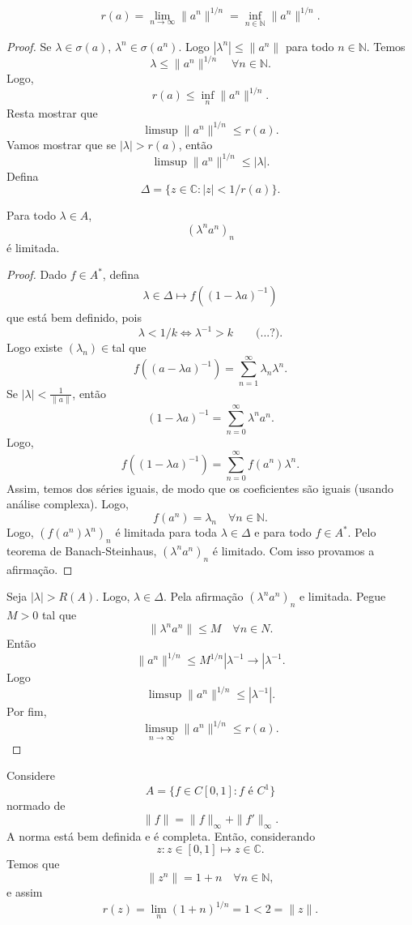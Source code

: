 \documentclass[portuguese]{article}
\theoremstyle{definition}
\newcommand{\N}{\mathbb{N}}
\newcommand{\C}{\mathbb{C}}
\begin{document}
\begin{teo}
	\[r(a)=\lim_{n\to\infty}\|a^n\|^{1/n}=\inf_{n\in\N}\|a^n\|^{1/n}.\]
\end{teo}
\begin{proof}
	Se $\lambda\in\sigma(a)$, $\lambda^n\in\sigma(a^n)$. Logo $|\lambda^n|\leq\|a^n\|$ para todo $n\in\N$. Temos
	\[\lambda\leq\|a^n\|^{1/n}\quad\forall n\in\N.\]
	Logo,
	\[r(a)\leq\inf_n\|a^n\|^{1/n}.\]
	Resta mostrar que
	\[\limsup\|a^n\|^{1/n}\leq r(a).\]
	Vamos mostrar que se $|\lambda|>r(a)$, então
	\[\limsup\|a^n\|^{1/n}\leq|\lambda|.\]
	Defina
	\[\Delta=\{z\in\C:|z|<1/r(a)\}.\]
	\begin{af*}
		Para todo $\lambda\in A$,
		\[(\lambda^na^n)_n\]
		é limitada.
	\end{af*}
\begin{proof}
		Dado $f\in A^*$, defina
	\begin{align*}
		\lambda\in\Delta\mapsto f((1-\lambda a)^{-1})
	\end{align*}
	{\color{orange} que está bem definido, pois
		\[\lambda<1/k\iff\lambda^{-1}>k \qquad\text{(...?)}.\]
}
	Logo existe $(\lambda_n)\in $tal que
	\[f((a-\lambda a)^{-1})=\sum_{n=1}^\infty \lambda_n\lambda^n.\]
	Se $|\lambda|<\frac{1}{\|a\|}$, então
	\[(1-\lambda a)^{-1}=\sum_{n=0}^\infty\lambda^na^n.\]
	Logo,
	\[f((1-\lambda a)^{-1})=\sum_{n=0}^\infty f(a^n)\lambda^n.\]
	Assim, temos dos séries iguais, de modo que os coeficientes são iguais {\color{persiangreen} (usando análise complexa)}. Logo,
	\[f(a^n)=\lambda_n\quad\forall n\in \N.\]
	Logo, $(f(a^n)\lambda^n)_n$ é limitada para toda $\lambda\in\Delta$ e para todo $f\in A^*$. Pelo teorema de Banach-Steinhaus, $(\lambda^na^n)_n$ é limitado. Com isso provamos a afirmação.
\end{proof}
Seja $|\lambda|>R(A)$. Logo, $\lambda\in\Delta$. Pela afirmação $(\lambda^na^n)_n$ e limitada. Pegue $M>0$ tal que
\[\|\lambda^na^n\|\leq M\quad\forall n\in N.\]
Então
\[\|a^n\|^{1/n}\leq M^{1/n}|\lambda^{-1}\longrightarrow|\lambda^{-1}.\]
Logo
\[\limsup\|a^n\|^{1/n}\leq|\lambda^{-1}|.\]
Por fim,
\[\limsup_{n\to\infty}\|a^n\|^{1/n}\leq r(a).\]
\end{proof}

\begin{exemplo}
	Considere 
	\[A=\{f\in C[0,1]:f\text{ é }C^1\}\]
	normado de
	\[\|f\|=\|f\|_\infty+\|f'\|_\infty.\]
	{\color{orange}A norma está bem definida e é completa.} Então, considerando
	\[z:z\in[0,1]\mapsto z\in\C.\]
	Temos que
	\[\|z^n\|=1+n\quad\forall n\in\N,\]
	e assim
	\[r(z)=\lim_n(1+n)^{1/n}=1<2=\|z\|.\]
\end{exemplo}
\end{document}
